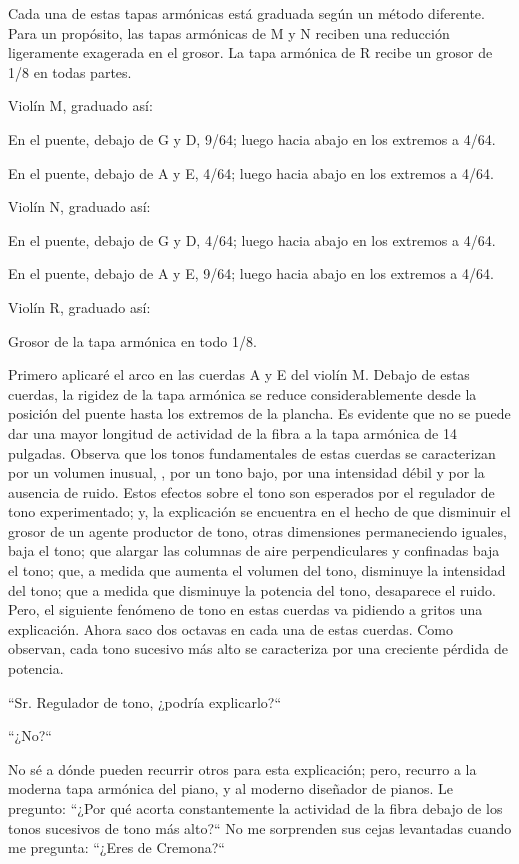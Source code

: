 \documentclass[12pt]{book}
\begin{document}
Cada una de estas tapas armónicas está graduada según un método diferente. Para un propósito, las tapas armónicas de M y N reciben una reducción ligeramente exagerada en el grosor. La tapa armónica de R recibe un grosor de 1/8 en todas partes.

Violín M, graduado así:

En el puente, debajo de G y D, 9/64; luego hacia abajo en los extremos a 4/64.

En el puente, debajo de A y E, 4/64; luego hacia abajo en los extremos a 4/64.

Violín N, graduado así:

En el puente, debajo de G y D, 4/64; luego hacia abajo en los extremos a 4/64.

En el puente, debajo de A y E, 9/64; luego hacia abajo en los extremos a 4/64.

Violín R, graduado así:

Grosor de la tapa armónica en todo 1/8.

Primero aplicaré el arco en las cuerdas A y E del violín M. Debajo de estas cuerdas, la rigidez de la tapa armónica se reduce considerablemente desde la posición del puente hasta los extremos de la plancha. Es evidente que no se puede dar una mayor longitud de actividad de la fibra a la tapa armónica de 14 pulgadas. Observa que los tonos fundamentales de estas cuerdas se caracterizan por un volumen inusual, , por un tono bajo, por una intensidad débil y por la ausencia de ruido. Estos efectos sobre el tono son esperados por el regulador de tono experimentado; y, la explicación se encuentra en el hecho de que disminuir el grosor de un agente productor de tono, otras dimensiones permaneciendo iguales, baja el tono; que alargar las columnas de aire perpendiculares y confinadas baja el tono; que, a medida que aumenta el volumen del tono, disminuye la intensidad del tono; que a medida que disminuye la potencia del tono, desaparece el ruido. Pero, el siguiente fenómeno de tono en estas cuerdas va pidiendo a gritos una explicación. Ahora saco dos octavas en cada una de estas cuerdas. Como observan, cada tono sucesivo más alto se caracteriza por una creciente pérdida de potencia.

``Sr. Regulador de tono, ¿podría explicarlo?``

``¿No?``

No sé a dónde pueden recurrir otros para esta explicación; pero, recurro a la moderna tapa armónica del piano, y al moderno diseñador de pianos. Le pregunto: ``¿Por qué acorta constantemente la actividad de la fibra debajo de los tonos sucesivos de tono más alto?`` No me sorprenden sus cejas levantadas cuando me pregunta: ``¿Eres de Cremona?``
\end{document}
